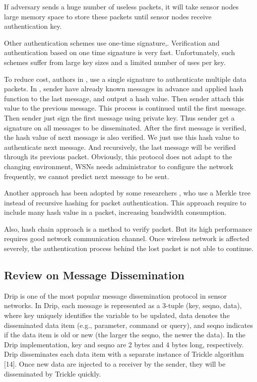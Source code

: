 \documentclass{sig-alternate-05-2015}
\begin{document}
If adversary sends a huge number of useless packets, it will take sensor nodes large memory space to store these packets until sensor nodes receive authentication key.

Other authentication schemes use one-time signature\cite{Biba},\cite{HORSIC}. Verification and authentication based on one time signature is very fast. Unfortunately, such schemes suffer from large key sizes and a limited number of uses per key.

To reduce cost, authors in \cite{aspect}, \cite{aspect} use a single signature to authenticate multiple data packets. In \cite{aspect}, sender have already known messages in advance and applied hash function to the last message, and output a hash value. Then sender attach this value to the previous message. This process is continued until the first message. Then sender just sign the first message using private key. Thus sender get a signature on all messages to be disseminated. After the first message is verified, the hash value of next message is also verified. We just use this hash value to authenticate next message. And recursively, the last message will be verified through its previous packet. Obviously, this protocol does not adapt to the changing environment, WSNs needs administrator to configure the network frequently, we cannot predict next message to be sent. 


Another approach has been adopted by some researchers \cite{hashtree}, who use a Merkle tree instead of recursive hashing for packet authentication. This approach require to include many hash value in a packet, increasing bandwidth consumption.

Also, hash chain approach \cite{nested} is a method to verify packet. But its high performance requires good network communication channel. Once wireless network is affected severely, the authentication process behind the lost packet is not able to continue.
 
\subsection{Review on Message Dissemination}
Drip is one of the most popular message dissemination protocol in sensor networks. In Drip, each message is represented as a 3-tuple (key, seqno, data), where key uniquely identifies the variable to be updated, data denotes the disseminated data item (e.g., parameter, command or query), and seqno indicates if the data item is old or new (the larger the seqno, the newer the data). In the Drip implementation, key and seqno are 2 bytes and 4 bytes long, respectively. Drip disseminates each data item with a separate instance of Trickle algorithm [14]. Once new data are injected to a receiver by the sender, they will be disseminated by Trickle quickly.
	
\end{document}
